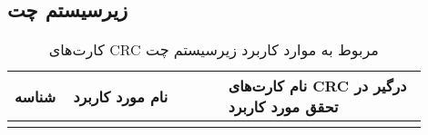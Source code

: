 \subsection{زیرسیستم چت}


\begin{table}[ht!]
	\centering
	\begin{tabular}{|p{0.1\linewidth}|p{0.35\linewidth}|p{0.45\linewidth}|} 
		\hline
		شناسه  & نام مورد کاربرد  & نام کارت‌های CRC درگیر در تحقق مورد کاربرد\\ 
		\hline

		\usecasecrcitem{امکان مشاهده‌ی لیست پیام‌ها}{کاتالوگ پیام، کاربر عادی، پیام}
		\usecasecrcitem{امکان ارسال پیام}{کاتالوگ پیام، کاربر عادی، پیام}
		\usecasecrcitem{امکان دریافت پیام}{کاتالوگ پیام، کاربر عادی، پیام}
	\end{tabular}
	\caption{کارت‌های CRC مربوط به موارد کاربرد زیرسیستم چت}
\end{table}


